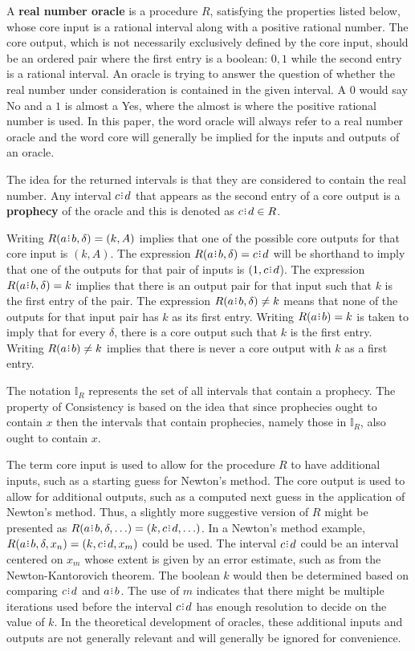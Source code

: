 \documentclass[12pt]{article}
\begin{document}
A \textbf{real number oracle} is a procedure $R$, satisfying the properties listed below, whose core input is a rational interval along with a positive rational number. The core output, which is not necessarily exclusively defined by the core input, should be an ordered pair where the first entry is a boolean:  $0, 1$ while the second entry is a rational interval. An oracle is trying to answer the question of whether the real number under consideration is contained in the given interval. A $0$ would say No and a $1$ is almost a Yes, where the almost is where the positive rational number is used.  In this paper, the word oracle will always refer to a real number oracle and the word core will generally be implied for the inputs and outputs of an oracle.


The idea for the returned intervals is that they are considered to contain the real number. Any interval $c\rint d$ that appears as the second entry of a core output is a \textbf{prophecy} of the oracle and this is denoted as $c\rint d \in R$. 

Writing $R(a\rint b, \delta)=(k ,A)$ implies that one of the possible core outputs for that core input is $(k, A)$. The expression $R(a\rint b, \delta) = c\rint d$ will be shorthand to imply that one of the outputs for that pair of inputs is $(1, c\rint d$).  The expression $R(a \rint b, \delta) = k$ implies that there is an output pair for that input such that $k$ is the first entry of the pair. The expression $R(a\rint b, \delta) \neq k$ means that none of the outputs for that input pair has $k$ as its first entry.  Writing $R(a \rint b) = k$ is taken to imply that for every $\delta$, there is a core output such that $k$ is the first entry. Writing $R(a \rint b) \neq k$ implies that there is never a core output with $k$ as a first entry. 

The notation $\mathbb{I}_R$ represents the set of all intervals that contain a prophecy. The property of Consistency is based on the idea that since prophecies ought to contain $x$ then the intervals that contain prophecies, namely those in $\mathbb{I}_R$,  also ought to contain $x$. 

The term core input is used to allow for the procedure $R$ to have additional inputs, such as a starting guess for Newton's method. The core output is used to allow for additional outputs, such as a computed next guess in the application of Newton's method. Thus, a slightly more suggestive version of $R$ might be presented as $R(a \rint b, \delta, \ldots) = (k, c \rint d, \ldots)$. In a Newton's method example, $R(a \rint b, \delta, x_n) = (k, c \rint d, x_m)$ could be used. The interval $c \rint d$ could be an interval centered on $x_m$ whose extent is given by an error estimate, such as from the Newton-Kantorovich theorem. The boolean $k$ would then be determined based on comparing $c \rint d$ and $a \rint b$. The use of $m$ indicates that there might be multiple iterations used before the interval $c \rint d$ has enough resolution to decide on the value of $k$. In the theoretical development of oracles, these additional inputs and outputs are not generally relevant and will generally be ignored for convenience.  
\end{document}
